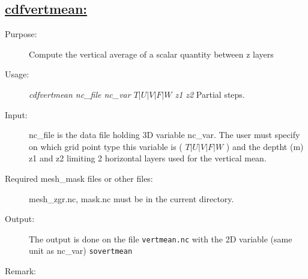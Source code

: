 \documentclass[a4paper,11pt]{article}
\begin{document}
\newpage
\subsection*{\underline{cdfvertmean:}}
\begin{description}
\item[Purpose:]  Compute the vertical average of a scalar quantity  between z layers
\item[Usage:] {\em cdfvertmean nc\_file nc\_var  $T | U | V | F | W$ z1 z2  } Partial steps.
\item[Input:]  nc\_file  is the data file holding 3D variable nc\_var. The user must specify on which grid point type
this variable is ( $T | U | V | F | W$ ) and the deptht (m) z1 and z2 limiting 2 horizontal layers used for the vertical mean.
\item[Required mesh\_mask files or other files:] mesh\_zgr.nc, mask.nc must be in the current directory.
\item[Output:]  The output is done on the file {\tt vertmean.nc} with the 2D variable (same unit as nc\_var) {\tt sovertmean}
\item[Remark:]
\end{description}

\newpage
\end{document}
